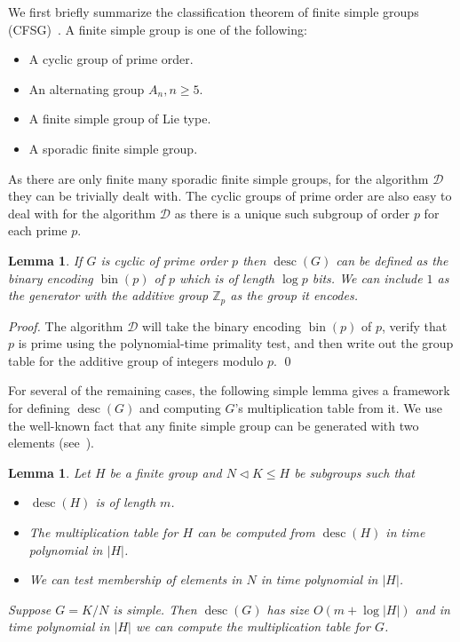 \documentclass{elsarticle}
\newtheorem{lemma}[theorem]{Lemma}
\newcommand{\desc}{\mathop{\mathrm{desc}}}
\newcommand{\bin}{\mathop{\mathrm{bin}}}
\begin{document}
We first briefly summarize the classification theorem of finite simple
groups (CFSG)~\cite{CFSG}. A finite simple group is one of the
following:

\begin{itemize}
\item A cyclic group of prime order.
\item An alternating group $A_n, n\ge 5$.
\item A finite simple group of Lie type.
\item A sporadic finite simple group.
\end{itemize}

As there are only finite many sporadic finite simple groups, for the
algorithm $\mathcal{D}$ they can be trivially dealt with.  The cyclic
groups of prime order are also easy to deal with for the algorithm
$\mathcal{D}$ as there is a unique such subgroup of order $p$ for each
prime $p$.

\begin{lemma}\label{cyclic}
  If $G$ is cyclic of prime order $p$ then $\desc(G)$ can be defined
  as the binary encoding $\bin(p)$ of $p$ which is of length $\log p$
  bits. We can include $1$ as the generator with the additive group
  $\mathbb{Z}_p$ as the group it encodes.
\end{lemma}

\begin{proof}
  The algorithm $\mathcal{D}$ will take the binary encoding $\bin(p)$
  of $p$, verify that $p$ is prime using the polynomial-time primality
  test, and then write out the group table for the additive group of
  integers modulo $p$. \qed
\end{proof}

For several of the remaining cases, the following simple lemma gives a
framework for defining $\desc(G)$ and computing $G$'s multiplication
table from it. We use the well-known fact that any finite simple group
can be generated with two elements (see~\cite{DMT}).

\begin{lemma}\label{naive}
  Let $H$ be a finite group and $N\lhd K\le H$ be subgroups such that
  \begin{itemize}
  \item $\desc(H)$ is of length $m$.
  \item The multiplication table for $H$ can be computed from
    $\desc(H)$ in time polynomial in $|H|$.
  \item We can test membership of elements in $N$ in time polynomial
    in $|H|$.
  \end{itemize}
  Suppose $G=K/N$ is simple. Then $\desc(G)$ has size
  $O(m + \log |H|)$ and in time polynomial in $|H|$ we can compute the
  multiplication table for $G$.
\end{lemma}
\end{document}
